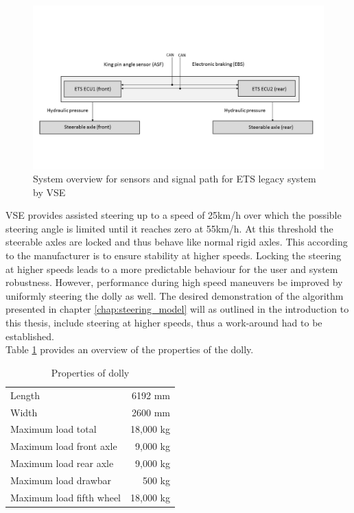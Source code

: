 \documentclass[ExampleMasters.tex]{subfiles}
\begin{document}
\begin{figure}[!htb]
	\centering
	\includegraphics[width=1\linewidth]{figures/system_overview_ETS}
	
	\caption{System overview for sensors and signal path for \gls{ETS} legacy system by VSE}
	\label{fig:system_overview_ETS}
\end{figure}


VSE provides assisted steering up to a speed of 25km/h over which the possible steering angle is limited until it reaches zero at 55km/h. At this threshold the steerable axles are locked and thus behave like normal rigid axles. This according to the manufacturer is to ensure stability at higher speeds.\cite{dolly_datasheet} Locking the steering at higher speeds leads to a more predictable behaviour for the user and system robustness. However, performance during high speed maneuvers be improved by uniformly steering the dolly as well.\cite{performance_improvement} The desired demonstration of the algorithm presented in chapter \ref{chap:steering_model} will as outlined in the introduction to this thesis, include steering at higher speeds, thus a work-around had to be established.\\
Table \ref{tab:dolly_prop} provides an overview of the properties of the dolly.

\begin{table}[!htb]
	\centering
	\caption{Properties of dolly}
	\label{tab:dolly_prop}
	\begin{tabular}{l r}
		Length   & 6192 mm   \\ 
		Width   &       2600 mm     \\
		Maximum load total   &      18,000 kg   \\
		Maximum load front axle &      9,000 kg      \\
		Maximum load rear axle& 9,000 kg  \\
		Maximum load drawbar& 500 kg  \\
		Maximum load fifth wheel& 18,000 kg  \\
	\end{tabular} \\
\end{table}
\end{document}
